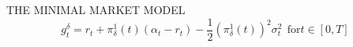 \documentclass[unknownkeysallowed, compress]{beamer}
\theoremstyle{plain}
\begin{document}
\begin{frame}[allowframebreaks]{THE MINIMAL MARKET MODEL}
\begin{equation}\label{9.1.9}
g_t^\delta = r_t+\pi_\delta^1(t)(\alpha_t-r_t)-\frac{1}{2}(\pi_\delta^1(t))^2\sigma_t^2 ~~\mbox{for} t\in[0,T]
\end{equation}





\end{frame}
\end{document}
